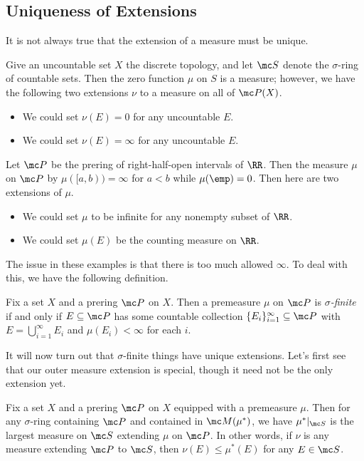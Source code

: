 \documentclass[../notes.tex]{subfiles}
\begin{document}
\subsection{Uniqueness of Extensions}
It is not always true that the extension of a measure must be unique.
\begin{example}
	Give an uncountable set $X$ the discrete topology, and let $\mc S$ denote the $\sigma$-ring of countable sets. Then the zero function $\mu$ on $S$ is a measure; however, we have the following two extensions $\nu$ to a measure on all of $\mc P(X)$.
	\begin{itemize}
		\item We could set $\nu(E)=0$ for any uncountable $E$.
		\item We could set $\nu(E)=\infty$ for any uncountable $E$.
	\end{itemize}
\end{example}
\begin{ex}
	Let $\mc P$ be the prering of right-half-open intervals of $\RR$. Then the measure $\mu$ on $\mc P$ by $\mu([a,b))=\infty$ for $a<b$ while $\mu(\emp)=0$. Then here are two extensions of $\mu$.
	\begin{itemize}
		\item We could set $\mu$ to be infinite for any nonempty subset of $\RR$.
		\item We could set $\mu(E)$ be the counting measure on $\RR$.
	\end{itemize}
\end{ex}
The issue in these examples is that there is too much allowed $\infty$. To deal with this, we have the following definition.
\begin{defihelper} 
	Fix a set $X$ and a prering $\mc P$ on $X$. Then a premeasure $\mu$ on $\mc P$ is \textit{$\sigma$-finite} if and only if $E\subseteq\mc P$ has some countable collection $\{E_i\}_{i=1}^\infty\subseteq\mc P$ with $E=\bigcup_{i=1}^\infty E_i$ and $\mu(E_i)<\infty$ for each $i$.
\end{defihelper}
It will now turn out that $\sigma$-finite things have unique extensions. Let's first see that our outer measure extension is special, though it need not be the only extension yet.
\begin{lemma} \label{lem:outer-is-largest}
	Fix a set $X$ and a prering $\mc P$ on $X$ equipped with a premeasure $\mu$. Then for any $\sigma$-ring containing $\mc P$ and contained in $\mc M(\mu^*)$, we have $\mu^*|_{\mc S}$ is the largest measure on $\mc S$ extending $\mu$ on $\mc P$. In other words, if $\nu$ is any measure extending $\mc P$ to $\mc S$, then $\nu(E)\le\mu^*(E)$ for any $E\in\mc S$.
\end{lemma}
\end{document}
